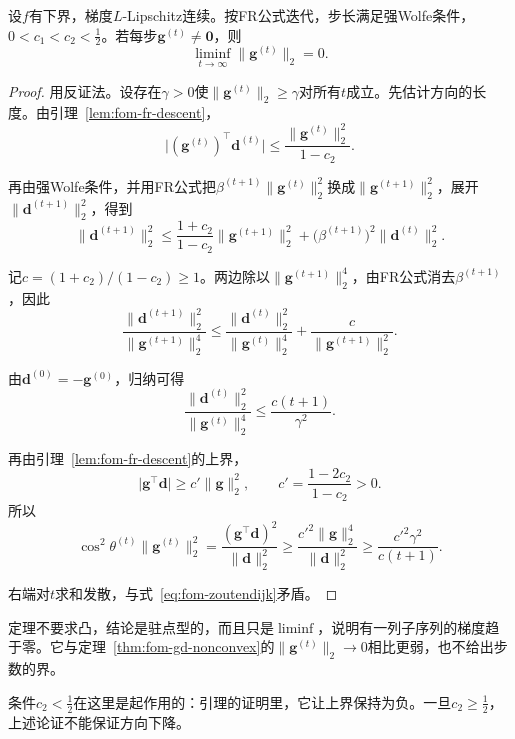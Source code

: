 \begin{theorem}[FR与强Wolfe线搜索]
\label{thm:fom-fr-convergence}
设$f$有下界，梯度$L$-Lipschitz连续。按FR公式迭代，步长满足强Wolfe条件，$0<c_1<c_2<\tfrac12$。若每步$\bm{g}^{(t)}\neq\bm{0}$，则
\begin{equation}
 \liminf_{t\to\infty}\lVert\bm{g}^{(t)}\rVert_2=0.
 \label{eq:fom-fr-convergence}
\end{equation}
\end{theorem}

\begin{proof}
用反证法。设存在$\gamma>0$使$\lVert\bm{g}^{(t)}\rVert_2\geq\gamma$对所有$t$成立。先估计方向的长度。由引理~\ref{lem:fom-fr-descent}，
\[
 \bigl\lvert(\bm{g}^{(t)})^\top\bm{d}^{(t)}\bigr\rvert\leq\frac{\lVert\bm{g}^{(t)}\rVert_2^2}{1-c_2}.
\]

再由强Wolfe条件，并用FR公式把$\beta^{(t+1)}\lVert\bm{g}^{(t)}\rVert_2^2$换成$\lVert\bm{g}^{(t+1)}\rVert_2^2$，展开$\lVert\bm{d}^{(t+1)}\rVert_2^2$，得到
\[
 \lVert\bm{d}^{(t+1)}\rVert_2^2\leq\frac{1+c_2}{1-c_2}\lVert\bm{g}^{(t+1)}\rVert_2^2+\bigl(\beta^{(t+1)}\bigr)^2\lVert\bm{d}^{(t)}\rVert_2^2.
\]

记$c=(1+c_2)/(1-c_2)\geq1$。两边除以$\lVert\bm{g}^{(t+1)}\rVert_2^4$，由FR公式消去$\beta^{(t+1)}$，因此
\[
 \frac{\lVert\bm{d}^{(t+1)}\rVert_2^2}{\lVert\bm{g}^{(t+1)}\rVert_2^4}\leq\frac{\lVert\bm{d}^{(t)}\rVert_2^2}{\lVert\bm{g}^{(t)}\rVert_2^4}+\frac{c}{\lVert\bm{g}^{(t+1)}\rVert_2^2}.
\]

由$\bm{d}^{(0)}=-\bm{g}^{(0)}$，归纳可得
\[
 \frac{\lVert\bm{d}^{(t)}\rVert_2^2}{\lVert\bm{g}^{(t)}\rVert_2^4}\leq\frac{c(t+1)}{\gamma^2}.
\]

再由引理~\ref{lem:fom-fr-descent}的上界，
\[
 \lvert\bm{g}^\top\bm{d}\rvert\geq c'\lVert\bm{g}\rVert_2^2,\qquad c'=\frac{1-2c_2}{1-c_2}>0.
\]
所以
\[
 \cos^2\theta^{(t)}\lVert\bm{g}^{(t)}\rVert_2^2=\frac{(\bm{g}^\top\bm{d})^2}{\lVert\bm{d}\rVert_2^2}\geq\frac{c'^2\lVert\bm{g}\rVert_2^4}{\lVert\bm{d}\rVert_2^2}\geq\frac{c'^2\gamma^2}{c(t+1)}.
\]

右端对$t$求和发散，与式~\eqref{eq:fom-zoutendijk}矛盾。
\end{proof}

定理不要求凸，结论是驻点型的，而且只是$\liminf$，说明有一列子序列的梯度趋于零。它与定理~\ref{thm:fom-gd-nonconvex}的$\lVert\bm{g}^{(t)}\rVert_2\to0$相比更弱，也不给出步数的界。

条件$c_2<\tfrac12$在这里是起作用的：引理的证明里，它让上界保持为负。一旦$c_2\geq\tfrac12$，上述论证不能保证方向下降。

